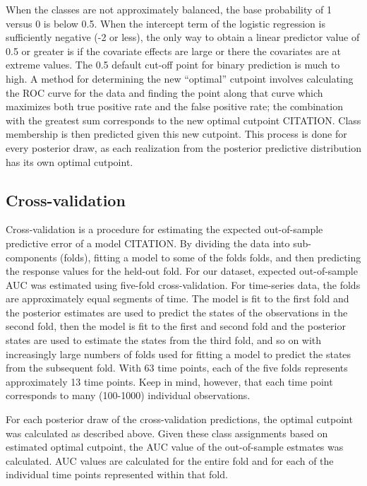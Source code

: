 \documentclass[12pt,letterpaper]{article}
\begin{document}
When the classes are not approximately balanced, the base probability of 1 versus 0 is below 0.5. When the intercept term of the logistic regression is sufficiently negative (-2 or less), the only way to obtain a linear predictor value of 0.5 or greater is if the covariate effects are large or there the covariates are at extreme values. The 0.5 default cut-off point for binary prediction is much to high. A method for determining the new ``optimal'' cutpoint involves calculating the ROC curve for the data and finding the point along that curve which maximizes both true positive rate and the false positive rate; the combination with the greatest sum corresponds to the new optimal cutpoint CITATION. Class membership is then predicted given this new cutpoint. This process is done for every posterior draw, as each realization from the posterior predictive distribution has its own optimal cutpoint.


\subsection{Cross-validation}

Cross-validation is a procedure for estimating the expected out-of-sample predictive error of a model CITATION. By dividing the data into sub-components (folds), fitting a model to some of the folds folds, and then predicting the response values for the held-out fold. For our dataset, expected out-of-sample AUC was estimated using five-fold cross-validation. For time-series data, the folds are approximately equal segments of time. The model is fit to the first fold and the posterior estimates are used to predict the states of the observations in the second fold, then the model is fit to the first and second fold and the posterior states are used to estimate the states from the third fold, and so on with increasingly large numbers of folds used for fitting a model to predict the states from the subsequent fold. With 63 time points, each of the five folds represents approximately 13 time points. Keep in mind, however, that each time point corresponds to many (100-1000) individual observations.

For each posterior draw of the cross-validation predictions, the optimal cutpoint was calculated as described above. Given these class assignments based on estimated optimal cutpoint, the AUC value of the out-of-sample estmates was calculated. AUC values are calculated for the entire fold and for each of the individual time points represented within that fold.
\end{document}
